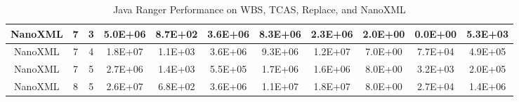 \begin{table*}[]
\begin{tabular}{@{}ccccccccccc@{}}
        NanoXML                                                  & 7                                                          & 3    & 5.0E+06                                                     & 8.7E+02                                                               & 3.6E+06                                                 & 8.3E+06                                                    & 2.3E+06                                                        & 2.0E+00                                                   & 0.0E+00                                                   & 5.3E+03 \\ \midrule
        NanoXML                                                  & 7                                                          & 4    & 1.8E+07                                                     & 1.1E+03                                                               & 3.6E+06                                                 & 9.3E+06                                                    & 1.2E+07                                                        & 7.0E+00                                                   & 7.7E+04                                                   & 4.9E+05 \\ \midrule
        NanoXML                                                  & 7                                                          & 5    & 2.7E+06                                                     & 1.4E+03                                                               & 5.5E+05                                                 & 1.7E+06                                                    & 1.6E+06                                                        & 8.0E+00                                                   & 3.2E+03                                                   & 2.0E+05 \\ \midrule
        NanoXML                                                  & 8                                                          & 5    & 2.6E+07                                                     & 6.8E+02                                                               & 3.6E+06                                                 & 1.1E+07                                                    & 1.8E+07                                                        & 8.0E+00                                                   & 2.7E+04                                                   & 1.4E+06 \\ \bottomrule
    \end{tabular}
    \caption{Java Ranger Performance on WBS, TCAS, Replace, and NanoXML}
    \label{table:results1}
\end{table*}

